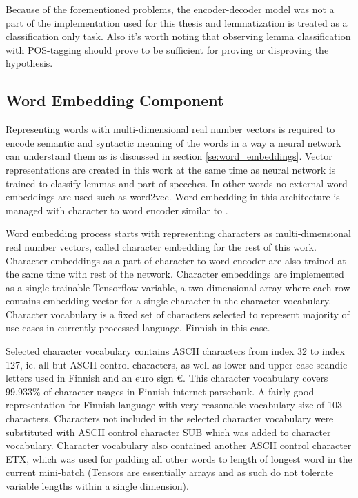 \documentclass[12pt,a4paper,english
]{tutthesis}
\begin{document}
Because of the forementioned problems, the encoder-decoder model was not a part of the implementation used for this thesis and lemmatization is treated as a classification only task. Also it's worth noting that observing lemma classification with POS-tagging should prove to be sufficient for proving or disproving the hypothesis. 

\subsection{Word Embedding Component}
\label{ss:word_embedding_component}
Representing words with multi-dimensional real number vectors is required to encode semantic and syntactic meaning of the words in a way a neural network can understand them as is discussed in section \ref{se:word_embeddings}. Vector representations are created in this work at the same time as neural network is trained to classify lemmas and part of speeches. In other words no external word embeddings are used such as word2vec. Word embedding in this architecture is managed with character to word encoder similar to \cite{Ling2015}.

Word embedding process starts with representing characters as multi-dimensional real number vectors, called character embedding for the rest of this work. Character embeddings as a part of character to word encoder are also trained at the same time with rest of the network. Character embeddings are implemented as a single trainable Tensorflow variable, a two dimensional array where each row contains embedding vector for a single character in the character vocabulary. Character vocabulary is a fixed set of characters selected to represent majority of use cases in currently processed language, Finnish in this case.

Selected character vocabulary contains ASCII characters from index 32 to index 127, ie. all but ASCII control characters, as well as lower and upper case scandic letters used in Finnish and an euro sign €. This character vocabulary covers 99,933\% of character usages in Finnish internet parsebank. A fairly good representation for Finnish language with very reasonable vocabulary size of 103 characters. Characters not included in the selected character vocabulary were substituted with ASCII control character SUB which was added to character vocabulary. Character vocabulary also contained another ASCII control character ETX, which was used for padding all other words to length of longest word in the current mini-batch (Tensors are essentially arrays and as such do not tolerate variable lengths within a single dimension).
\end{document}

